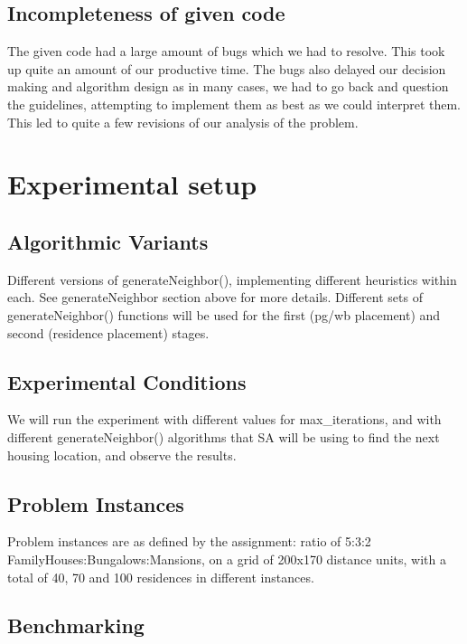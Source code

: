 \documentclass{article}
\begin{document}
\subsection{Incompleteness of given code}

The given code had a large amount of bugs which we had to resolve. This took up quite an amount of our productive time. The bugs also delayed our decision making and algorithm design as in many cases, we had to go back and question the guidelines, attempting to implement them as best as we could interpret them. This led to quite a few revisions of our analysis of the problem.

\section{Experimental setup}

\subsection{Algorithmic Variants}

Different versions of generateNeighbor(), implementing different heuristics within each. See generateNeighbor section above for more details. Different sets of generateNeighbor() functions will be used for the first (pg/wb placement) and second (residence placement) stages.

\subsection{Experimental Conditions}

We will run the experiment with different values for max\_iterations, and with different generateNeighbor() algorithms that SA will be using to find the next housing location, and observe the results.

\subsection{Problem Instances}

Problem instances are as defined by the assignment: ratio of 5:3:2 FamilyHouses:Bungalows:Mansions, on a grid of 200x170 distance units, with a total of 40, 70 and 100 residences in different instances.

\subsection{Benchmarking}
\end{document}
